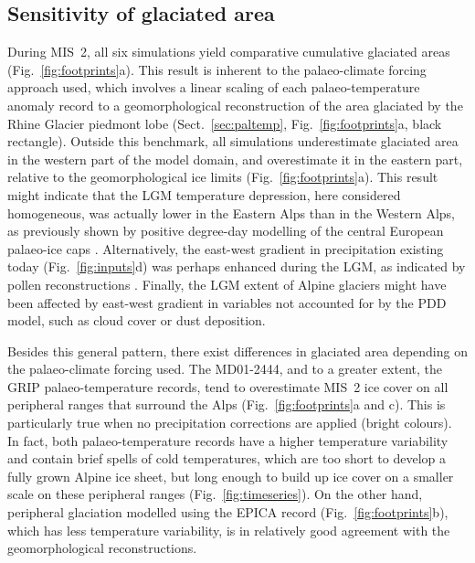 \documentclass[tc, manuscript]{copernicus}
\begin{document}
\subsection{Sensitivity of glaciated area}
\label{sec:footprints}

    During MIS~2, all six simulations yield comparative cumulative glaciated
    areas (Fig.~\ref{fig:footprints}a). This result is inherent to the
    palaeo-climate forcing approach used, which involves a linear scaling of
    each palaeo-temperature anomaly record to a geomorphological
    reconstruction of the area glaciated by the Rhine Glacier piedmont lobe
    (Sect.~\ref{sec:paltemp}, Fig.~\ref{fig:footprints}a, black rectangle).
    Outside this benchmark, all simulations underestimate glaciated area in the
    western part of the model domain, and overestimate it in the eastern
    part, relative to the geomorphological ice limits
    (Fig.~\ref{fig:footprints}a). This result might indicate that the LGM
    temperature depression, here considered homogeneous, was actually lower in
    the Eastern Alps than in the Western Alps, as previously shown by positive
    degree-day modelling of the central European palaeo-ice caps
    \citep{Heyman.etal.2013}. Alternatively, the east-west
    gradient in precipitation existing today (Fig.~\ref{fig:inputs}d) was
    perhaps enhanced during the LGM, as indicated by pollen reconstructions
    \citep{Wu.etal.2007}. Finally, the LGM extent of Alpine glaciers might have
    been affected by east-west gradient in variables not accounted for
    by the PDD model, such as cloud cover or dust deposition.

    Besides this general pattern, there exist differences in glaciated area
    depending on the palaeo-climate forcing used. The MD01-2444, and to a
    greater extent, the GRIP palaeo-temperature records, tend to overestimate
    MIS~2 ice cover on all peripheral ranges that surround the Alps
    (Fig.~\ref{fig:footprints}a and c). This is particularly true when no
    precipitation corrections are applied (bright colours). In fact, both
    palaeo-temperature records have a higher temperature variability and
    contain brief spells of cold temperatures, which are too short to develop a
    fully grown Alpine ice sheet, but long enough to build up ice cover on a
    smaller scale on these peripheral ranges (Fig.~\ref{fig:timeseries}). On
    the other hand, peripheral glaciation modelled using the EPICA record
    (Fig.~\ref{fig:footprints}b), which has less temperature variability,
    is in relatively good agreement with the geomorphological reconstructions.
\end{document}
